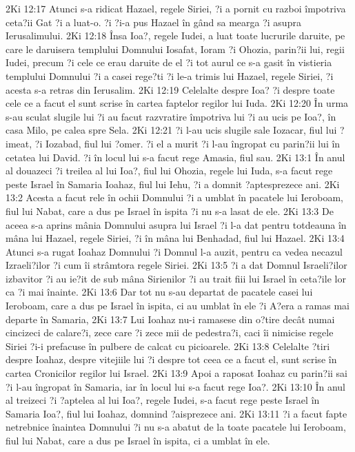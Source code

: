 2Ki 12:17  Atunci s-a ridicat Hazael, regele Siriei, ?i a pornit cu razboi împotriva ceta?ii Gat ?i a luat-o. ?i ?i-a pus Hazael în gând sa mearga ?i asupra Ierusalimului.
2Ki 12:18  Însa Ioa?, regele Iudei, a luat toate lucrurile daruite, pe care le daruisera templului Domnului Iosafat, Ioram ?i Ohozia, parin?ii lui, regii Iudei, precum ?i cele ce erau daruite de el ?i tot aurul ce s-a gasit în vistieria templului Domnului ?i a casei rege?ti ?i le-a trimis lui Hazael, regele Siriei, ?i acesta s-a retras din Ierusalim.
2Ki 12:19  Celelalte despre Ioa? ?i despre toate cele ce a facut el sunt scrise în cartea faptelor regilor lui Iuda.
2Ki 12:20  În urma s-au sculat slugile lui ?i au facut razvratire împotriva lui ?i au ucis pe Ioa?, în casa Milo, pe calea spre Sela.
2Ki 12:21  ?i l-au ucis slugile sale Iozacar, fiul lui ?imeat, ?i Iozabad, fiul lui ?omer. ?i el a murit ?i l-au îngropat cu parin?ii lui în cetatea lui David. ?i în locul lui s-a facut rege Amasia, fiul sau.
2Ki 13:1  În anul al douazeci ?i treilea al lui Ioa?, fiul lui Ohozia, regele lui Iuda, s-a facut rege peste Israel în Samaria Ioahaz, fiul lui Iehu, ?i a domnit ?aptesprezece ani.
2Ki 13:2  Acesta a facut rele în ochii Domnului ?i a umblat în pacatele lui Ieroboam, fiul lui Nabat, care a dus pe Israel în ispita ?i nu s-a lasat de ele.
2Ki 13:3  De aceea s-a aprins mânia Domnului asupra lui Israel ?i l-a dat pentru totdeauna în mâna lui Hazael, regele Siriei, ?i în mâna lui Benhadad, fiul lui Hazael.
2Ki 13:4  Atunci s-a rugat Ioahaz Domnului ?i Domnul l-a auzit, pentru ca vedea necazul Izraeli?ilor ?i cum îi strâmtora regele Siriei.
2Ki 13:5  ?i a dat Domnul Israeli?ilor izbavitor ?i au ie?it de sub mâna Sirienilor ?i au trait fiii lui Israel în ceta?ile lor ca ?i mai înainte.
2Ki 13:6  Dar tot nu s-au departat de pacatele casei lui Ieroboam, care a dus pe Israel în ispita, ci au umblat în ele ?i A?era a ramas mai departe în Samaria,
2Ki 13:7  Lui Ioahaz nu-i ramasese din o?tire decât numai cincizeci de calare?i, zece care ?i zece mii de pedestra?i, caci îi nimicise regele Siriei ?i-i prefacuse în pulbere de calcat cu picioarele.
2Ki 13:8  Celelalte ?tiri despre Ioahaz, despre vitejiile lui ?i despre tot ceea ce a facut el, sunt scrise în cartea Cronicilor regilor lui Israel.
2Ki 13:9  Apoi a raposat Ioahaz cu parin?ii sai ?i l-au îngropat în Samaria, iar în locul lui s-a facut rege Ioa?.
2Ki 13:10  În anul al treizeci ?i ?aptelea al lui Ioa?, regele Iudei, s-a facut rege peste Israel în Samaria Ioa?, fiul lui Ioahaz, domnind ?aisprezece ani.
2Ki 13:11  ?i a facut fapte netrebnice înaintea Domnului ?i nu s-a abatut de la toate pacatele lui Ieroboam, fiul lui Nabat, care a dus pe Israel în ispita, ci a umblat în ele.
